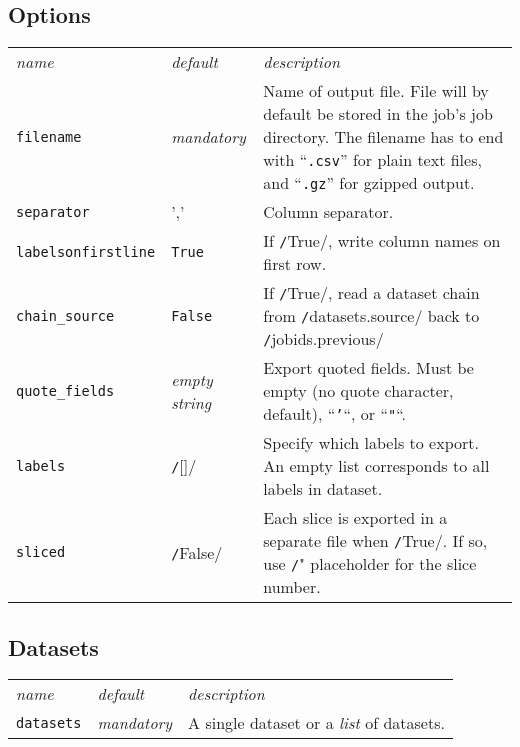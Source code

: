 \subsection*{Options}
\begin{tabular}{ p{3.2cm} p{1.8cm} p{10cm}}\hline
  \textsl{name} & \textsl{default} & \textsl{description}\\[2ex]

  \texttt{filename} & \textsl{mandatory} & Name of output file.
  File will by default be stored in the job's job directory.  The
  filename has to end with ``\texttt{.csv}'' for plain text files, and
  ``\texttt{.gz}'' for gzipped output.\\[1ex]
  \texttt{separator} & ',' & Column separator.\\[1ex]
  
  \texttt{labelsonfirstline} & \texttt{True} & If
  \texttt/True/, write column names on first row.\\[1ex]
  
  \texttt{chain\_source} & \texttt{False} & If
  \texttt/True/, read a dataset chain from
  \texttt/datasets.source/ back to
  \texttt/jobids.previous/\\[1ex]

  \texttt{quote\_fields} & \textsl{empty string} & Export quoted fields.  Must be empty
  (no quote character, default), ``\texttt{'}``, or ``\texttt{"}``.\\[1ex]
  
  \texttt{labels} & \texttt/[]/ & Specify which labels to
  export.  An empty list corresponds to all labels in dataset.\\[1ex]
  
  \texttt{sliced} & \texttt/False/ & Each slice is
  exported in a separate file when \texttt/True/.  If so,
  use \texttt/"%
  placeholder for the slice number.\\[1ex]
  \hline
\end{tabular}


\subsection*{Datasets}
\begin{tabular}{ p{3.2cm} p{1.8cm} p{10cm}}\hline
  \textsl{name} & \textsl{default} & \textsl{description}\\[2ex]
  \texttt{datasets} & \textsl{mandatory} & A single
  dataset or a \textsl{list} of datasets.\\[1ex]
  \hline
\end{tabular}


